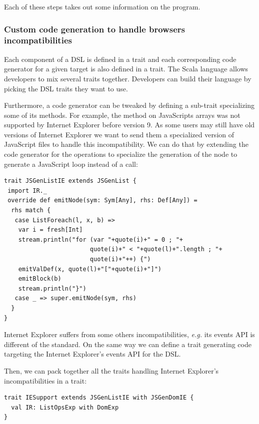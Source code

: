 \documentclass[american,english,runningheads]{llncs}
\newcommand{\eg}{\emph{e.g.}}
\begin{document}
Each of these steps takes out some information on the program.

\subsubsection{Custom code generation to handle browsers incompatibilities}

Each component of a DSL is defined in a trait and each corresponding code generator for a given target is also defined in a trait. The Scala language allows developers to mix several traits together. Developers can build their language by picking the DSL traits they want to use.

Furthermore, a code generator can be tweaked by defining a sub-trait specializing some of its methods. For example, the  method on JavaScripts arrays was not supported by Internet Explorer before version 9. As some users may still have old versions of Internet Explorer we want to send them a specialized version of JavaScript files to handle this incompatibility. We can do that by extending the code generator for the  operations to specialize the generation of the  node to generate a JavaScript  loop instead of a  call:

\begin{lstlisting}
trait JSGenListIE extends JSGenList {
 import IR._
 override def emitNode(sym: Sym[Any], rhs: Def[Any]) =
  rhs match {
   case ListForeach(l, x, b) =>
    var i = fresh[Int]
    stream.println("for (var "+quote(i)+" = 0 ; "+
                        quote(i)+" < "+quote(l)+".length ; "+
                        quote(i)+"++) {")
    emitValDef(x, quote(l)+"["+quote(i)+"]")
    emitBlock(b)
    stream.println("}")
   case _ => super.emitNode(sym, rhs)
  }
}
\end{lstlisting}

Internet Explorer suffers from some others incompatibilities, \eg{} its events API is different of the standard. On the same way we can define a  trait generating code targeting the Internet Explorer’s events API for the  DSL.

Then, we can pack together all the traits handling Internet Explorer’s incompatibilities in a  trait:

\begin{lstlisting}
trait IESupport extends JSGenListIE with JSGenDomIE {
  val IR: ListOpsExp with DomExp
}
\end{lstlisting}
\end{document}

